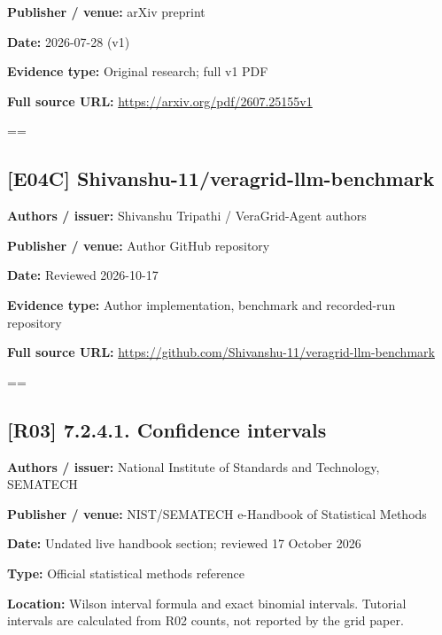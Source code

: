 \documentclass[10pt,letterpaper]{article}
\begin{document}
\textbf{Publisher / venue:} arXiv preprint\par
\textbf{Date:} 2026-07-28 (v1)\par
\textbf{Evidence type:} Original research; full v1 PDF\par
\textbf{Full source URL:} \href{https://arxiv.org/pdf/2607.25155v1}{\small\ttfamily https:/\allowbreak{}/\allowbreak{}arxiv.\allowbreak{}org/\allowbreak{}pdf/\allowbreak{}2607.\allowbreak{}25155v1}\par
\egroup\par\noindent\box\readingEntry\par\medskip
\setbox\readingEntry=\vbox\bgroup\hsize=\linewidth\subsection*{[E04C] Shivanshu-11/veragrid-llm-benchmark}
\textbf{Authors / issuer:} Shivanshu Tripathi / VeraGrid-Agent authors\par
\textbf{Publisher / venue:} Author GitHub repository\par
\textbf{Date:} Reviewed 2026-10-17\par
\textbf{Evidence type:} Author implementation, benchmark and recorded-run repository\par
\textbf{Full source URL:} \href{https://github.com/Shivanshu-11/veragrid-llm-benchmark}{\small\ttfamily https:/\allowbreak{}/\allowbreak{}github.\allowbreak{}com/\allowbreak{}Shivanshu-\allowbreak{}11/\allowbreak{}veragrid-\allowbreak{}llm-\allowbreak{}benchmark}\par
\egroup\par\noindent\box\readingEntry\par\medskip
\setbox\readingEntry=\vbox\bgroup\hsize=\linewidth\subsection*{[R03] 7.2.4.1. Confidence intervals}
\textbf{Authors / issuer:} National Institute of Standards and Technology, SEMATECH\par
\textbf{Publisher / venue:} NIST/SEMATECH e-Handbook of Statistical Methods\par
\textbf{Date:} Undated live handbook section; reviewed 17 October 2026\par
\textbf{Type:} Official statistical methods reference\par
\textbf{Location:} Wilson interval formula and exact binomial intervals. Tutorial intervals are calculated from R02 counts, not reported by the grid paper.\par
\end{document}
